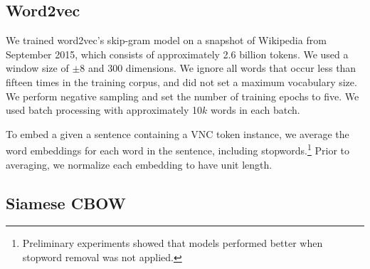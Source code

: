 \documentclass[11pt,a4paper]{article}
\begin{document}
\subsection{Word2vec}\label{word2vec}
%
%

We trained word2vec's skip-gram model \citep{mikolov+:2013b} on a
snapshot of Wikipedia from September 2015, which consists of
approximately 2.6 billion tokens. We used a window size of $\pm$8 and
300 dimensions. We ignore all words that occur less than fifteen times
in the training corpus, and did not set a maximum vocabulary size. We
perform negative sampling and set the number of training epochs to
five. We used batch processing with approximately 10$k$ words in each
batch.
	

To embed a given a sentence containing a VNC token instance, we
average the word embeddings for each word in the sentence, including
stopwords.\footnote{Preliminary experiments showed that models
  performed better when stopword removal was not applied.} Prior to
averaging, we normalize each embedding to have unit length.

\subsection{Siamese CBOW}
\end{document}
